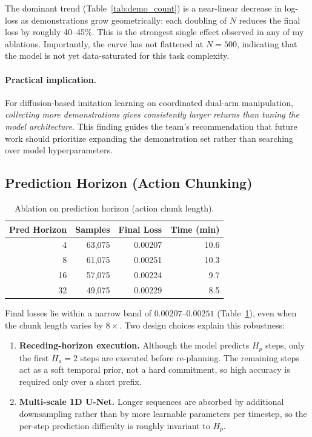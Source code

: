 \documentclass[11pt]{article}
\begin{document}
The dominant trend (Table~\ref{tab:demo_count}) is a near-linear
decrease in log-loss as demonstrations grow geometrically: each
doubling of $N$ reduces the final loss by roughly 40--45\%. This is
the strongest single effect observed in any of my ablations.
Importantly, the curve has not flattened at $N=500$, indicating that
the model is not yet data-saturated for this task complexity.

\paragraph{Practical implication.}
For diffusion-based imitation learning on coordinated dual-arm
manipulation, \emph{collecting more demonstrations gives consistently
larger returns than tuning the model architecture}. This finding
guides the team's recommendation that future work should prioritize
expanding the demonstration set rather than searching over model
hyperparameters.

\subsection{Prediction Horizon (Action Chunking)}

\begin{table}[H]
\centering
\small
\begin{tabular}{rrrr}
\toprule
\textbf{Pred Horizon} & \textbf{Samples} & \textbf{Final Loss} & \textbf{Time (min)} \\
\midrule
4  & 63{,}075 & 0.00207 & 10.6 \\
8  & 61{,}075 & 0.00251 & 10.3 \\
16 & 57{,}075 & 0.00224 & 9.7 \\
32 & 49{,}075 & 0.00229 & 8.5 \\
\bottomrule
\end{tabular}
\caption{Ablation on prediction horizon (action chunk length).}
\label{tab:pred_horizon}
\end{table}

Final losses lie within a narrow band of $0.00207$--$0.00251$
(Table~\ref{tab:pred_horizon}), even when the chunk length varies by
$8\times$. Two design choices explain this robustness:

\begin{enumerate}
    \item \textbf{Receding-horizon execution.} Although the model
    predicts $H_p$ steps, only the first $H_a = 2$ steps are executed
    before re-planning. The remaining steps act as a soft temporal
    prior, not a hard commitment, so high accuracy is required only
    over a short prefix.
    \item \textbf{Multi-scale 1D U-Net.} Longer sequences are
    absorbed by additional downsampling rather than by more
    learnable parameters per timestep, so the per-step prediction
    difficulty is roughly invariant to $H_p$.
\end{enumerate}
\end{document}
